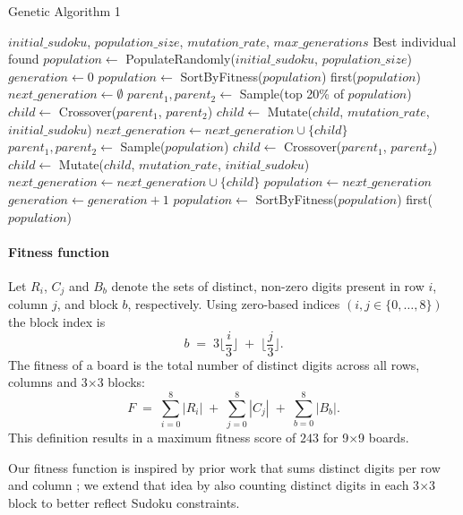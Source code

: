 \begin{algorithm}[H]
\caption{Genetic Algorithm 1}\label{alg:impl-1}
\begin{algorithmic}
\Require $initial\_sudoku$, $population\_size$, $mutation\_rate$, $max\_generations$
\Ensure Best individual found
\State $population \gets$ PopulateRandomly($initial\_sudoku$, $population\_size$)
\State $generation \gets 0$
  \State $population \gets$ SortByFitness($population$) 
    \State \Return first($population$)
  \EndIf
  \State $next\_generation \gets \emptyset$
    \State $parent_1, parent_2 \gets$ Sample(top 20\% of $population$)
    \State $child \gets$ Crossover($parent_1$, $parent_2$)
    \State $child \gets$ Mutate($child$, $mutation\_rate$, $initial\_sudoku$)
    \State $next\_generation \gets next\_generation \cup \{child\}$
  \EndFor
    \State $parent_1, parent_2 \gets$ Sample($population$)
    \State $child \gets$ Crossover($parent_1$, $parent_2$)
    \State $child \gets$ Mutate($child$, $mutation\_rate$, $initial\_sudoku$)
    \State $next\_generation \gets next\_generation \cup \{child\}$
  \EndFor
  \State $population \gets next\_generation$
  \State $generation \gets generation + 1$
\EndWhile
\State $population \gets$ SortByFitness($population$) 
\State \Return first($population$)
\end{algorithmic}
\end{algorithm}


\paragraph{Fitness function}\label{par:ff-impl1} Let $R_i$, $C_j$ and $B_b$ denote the sets of distinct, non-zero digits present in row $i$, column $j$, and block $b$, respectively. Using zero-based indices $(i,j\in\{0,\dots,8\})$ the block index is
\[
b \;=\; 3\Big\lfloor\frac{i}{3}\Big\rfloor \;+\; \Big\lfloor\frac{j}{3}\Big\rfloor .
\]
The fitness of a board is the total number of distinct digits across all rows, columns and 3\(\times\)3 blocks:
\[
F \;=\; \sum_{i=0}^{8} |R_i| \;+\; \sum_{j=0}^{8} |C_j| \;+\; \sum_{b=0}^{8} |B_b|.
\]
This definition results in a maximum fitness score of $243$ for 9$\times$9 boards.

Our fitness function is inspired by prior work that sums distinct digits per row and column \cite{Sato2011}; we extend that idea by also counting distinct digits in each 3$\times$3 block to better reflect Sudoku constraints.

